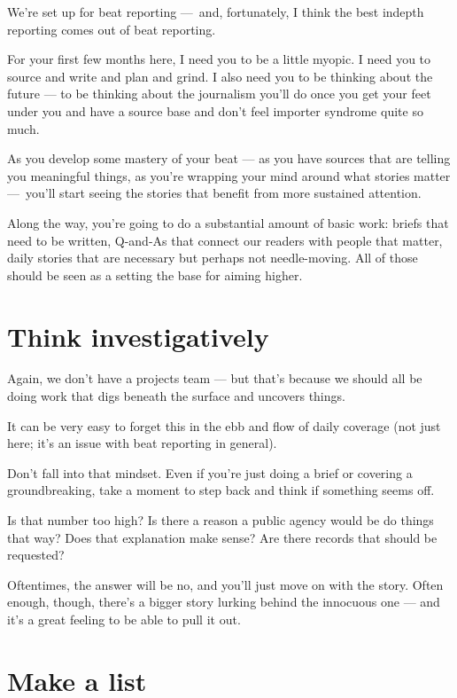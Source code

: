 \documentclass[
  11pt,
  american,
  letterpaperpaper,
  extrafontsizes,onecolumn,openright
  ]{memoir}
\newlength{\rf}
\begin{document}
We're set up for beat reporting ---~and, fortunately, I think the best indepth reporting comes out of beat reporting.

For your first few months here, I need you to be a little myopic. I need you to source and write and plan and grind. I also need you to be thinking about the future --- to be thinking about the journalism you'll do once you get your feet under you and have a source base and don't feel importer syndrome quite so much.

As you develop some mastery of your beat --- as you have sources that are telling you meaningful things, as you're wrapping your mind around what stories matter ---~you'll start seeing the stories that benefit from more sustained attention.

Along the way, you're going to do a substantial amount of basic work: briefs that need to be written, Q-and-As that connect our readers with people that matter, daily stories that are necessary but perhaps not needle-moving. All of those should be seen as a setting the base for aiming higher.

\hypertarget{think-investigatively}{%
\section*{Think investigatively}\label{think-investigatively}}

Again, we don't have a projects team --- but that's because we should all be doing work that digs beneath the surface and uncovers things.

It can be very easy to forget this in the ebb and flow of daily coverage (not just here; it's an issue with beat reporting in general).

Don't fall into that mindset. Even if you're just doing a brief or covering a groundbreaking, take a moment to step back and think if something seems off.

Is that number too high? Is there a reason a public agency would be do things that way? Does that explanation make sense? Are there records that should be requested?

Oftentimes, the answer will be no, and you'll just move on with the story. Often enough, though, there's a bigger story lurking behind the innocuous one --- and it's a great feeling to be able to pull it out.

\hypertarget{make-a-list}{%
\section*{Make a list}\label{make-a-list}}
\end{document}
